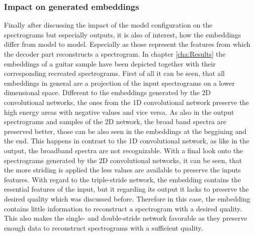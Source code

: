\subsubsection{Impact on generated embeddings}
Finally after discussing the impact of the model configuration on the spectrograms but especially outputs, it is also of interest, how the embeddings differ from model to model. Especially as those represent the features from which the decoder part reconstructs a spectrogram. In chapter \ref{cha:Results} the embeddings of a guitar sample have been depicted together with their corresponding recreated spectrograms. First of all it can be seen, that all embeddings in general are a projection of the input spectrograms on a lower dimensional space. Different to the embeddings generated by the 2D convolutional networks, the ones from the 1D convolutional network preserve the high energy areas with negative values and vice versa. As also in the output spectrograms and samples of the 2D network, the broad band spectra are preserved better, those can be also seen in the embeddings at the beggining and the end. This happens in contrast to the 1D convolutional network, as like in the output, the broadband spectra are not recognizable. With a final look onto the spectrograms generated by the 2D convolutional networks, it can be seen, that the more striding is applied the less values are available to preserve the inputs features. With regard to the triple-stride network, the embedding contains the essential features of the input, but it regarding its output it lacks to preserve the desired quality which was discussed before. Therefore in this case, the embedding contains little information to reconstruct a spectrogram with a desired quality. This also makes the single- and double-stride network favorable as they preserve enough data to reconstruct spectrograms with a sufficient quality.


